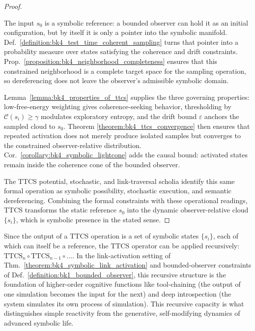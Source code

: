 \begin{proof}
\label{proof:bk4_symbolic_link_activation}
\leavevmode

The input $s_0$ is a symbolic reference: a bounded observer can hold it as an
initial configuration, but by itself it is only a pointer into the symbolic
manifold. Def.~\ref{definition:bk4_test_time_coherent_sampling} turns that
pointer into a probability measure over states satisfying the coherence and
drift constraints. Prop.~\ref{proposition:bk4_neighborhood_completeness} ensures
that this constrained neighborhood is a complete target space for the sampling
operation, so dereferencing does not leave the observer's admissible symbolic
domain.

Lemma~\ref{lemma:bk4_properties_of_ttcs} supplies the three governing
properties: low-free-energy weighting gives coherence-seeking behavior,
thresholding by $\mathcal C(s_i)\geq\gamma$ modulates exploratory entropy, and
the drift bound $\varepsilon$ anchors the sampled cloud to $s_0$. Theorem
\ref{theorem:bk4_ttcs_convergence} then ensures that repeated activation does
not merely produce isolated samples but converges to the constrained
observer-relative distribution. Cor.~\ref{corollary:bk4_symbolic_lightcone}
adds the causal bound: activated states remain inside the coherence cone of the
bounded observer.

The TTCS potential, stochastic, and link-traversal scholia identify this same
formal operation as symbolic possibility, stochastic execution, and semantic
dereferencing. Combining the formal constraints with these operational
readings, TTCS transforms the static reference $s_0$ into the dynamic
observer-relative cloud $\{s_i\}$, which is symbolic presence in the stated
sense.
\end{proof}

\begin{scholium}
\label{scholium:bk4_recursive_introspection}
Since the output of a TTCS operation is a set of symbolic states $\{s_i\}$, each of which can itself be a reference, the TTCS operator can be applied recursively: $\text{TTCS}_n \circ \text{TTCS}_{n-1} \circ \dots$. In the link-activation setting of Thm.~\ref{theorem:bk4_symbolic_link_activation} and bounded-observer constraints of Def.~\ref{definition:bk1_bounded_observer}, this recursive structure is the foundation of higher-order cognitive functions like tool-chaining (the output of one simulation becomes the input for the next) and deep introspection (the system simulates its own process of simulation). This recursive capacity is what distinguishes simple reactivity from the generative, self-modifying dynamics of advanced symbolic life.
\end{scholium}


